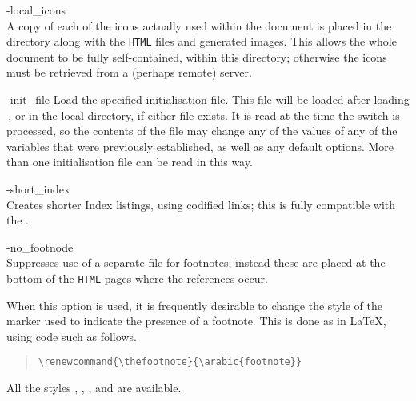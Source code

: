 \begin{htmllist}
\begin{changebar}
%

\item [-local\_icons\label{localicons}]
\\
A copy of each of the icons actually used within the document is placed in the
directory along with the \texttt{HTML} files and generated images.
This allows the whole document to be fully self-contained, within this directory;
otherwise the icons must be retrieved from a (perhaps remote) server.
\end{changebar}


%
%

\item [ -init\_file \Meta{file}\label{initfile}]
Load the specified initialisation file. This \Perl{} file will be loaded after loading
\,, or  in the local
directory, if either file exists. It is read at the time the switch is processed,
so the contents of the file may change any of the values of any of the
variables that were previously established, as well as any default options.
More than one initialisation file can be read in this way.%

%

\begin{changebar}\noindent
\item [ -short\_index\label{shortindex}]
\\
Creates shorter Index listings, using codified links;
this is fully compatible with the  .
\end{changebar}

%
%

\item [ -no\_footnode\label{nofootnode}]
\\
Suppresses use of a separate file for footnotes;
instead these are placed at the bottom of the \texttt{HTML} pages
where the references occur.

When this option is used, it is frequently desirable to change the
style of the marker used to indicate the presence of a footnote.
This is done as in \LaTeX, using code such as follows.
\begin{quote}
\verb|\renewcommand{\thefootnote}{\arabic{footnote}}|
\end{quote}
All the styles , , ,  and 
are available.


\end{htmllist}
